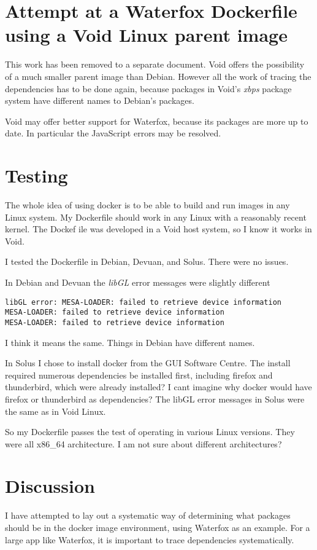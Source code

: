 \documentclass{article}  %
\begin{document}
\section{Attempt at a Waterfox Dockerfile using a Void Linux parent image}
This work has been removed to a separate document. Void offers the possibility of a much smaller parent image than Debian. However all the work of tracing the dependencies has to be done again, because packages in Void's {\em xbps} package system have different names to Debian's packages.

Void may offer better support for Waterfox, because its packages are more up to date. In particular the JavaScript errors may be resolved. 

\section{Testing}
The whole idea of using docker is to be able to build and run images in any Linux system. My Dockerfile should work in any Linux with a reasonably recent kernel. The Dockef ile was developed in a Void host system, so I know it works in Void.

I tested the Dockerfile in Debian, Devuan, and Solus. There were no issues.

In Debian and Devuan the {\em libGL} error messages were slightly different
\begin{verbatim}
libGL error: MESA-LOADER: failed to retrieve device information
MESA-LOADER: failed to retrieve device information
MESA-LOADER: failed to retrieve device information
\end{verbatim}
I think it means the same. Things in Debian have different names.

In Solus I chose to install docker from the GUI Software Centre. The install required numerous dependencies be installed first, including firefox and thunderbird, which were already installed?  I cant imagine why docker would have firefox or thunderbird as dependencies?  The libGL error messages in Solus were the same as in Void Linux. 

So my Dockerfile passes the test of operating in various Linux versions. They were all x86_64 architecture. I am not sure about different architectures?

\section{Discussion}
I have attempted to lay out a systematic way of determining what packages should be in the docker image environment, using Waterfox as an example. For a large app like Waterfox, it is important to trace dependencies systematically. 
\end{document}
